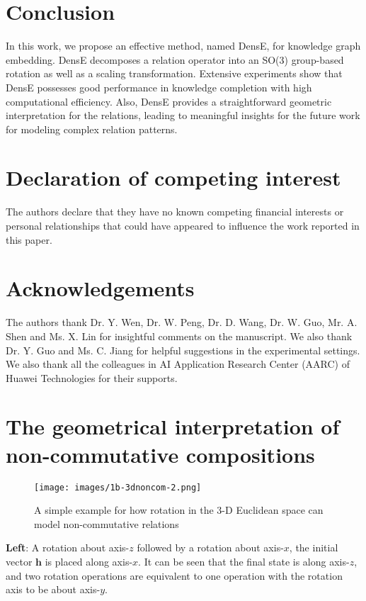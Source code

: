 \documentclass[11pt]{article}
\begin{document}
\section{Conclusion}
In this work, we propose an effective method, named DensE, for knowledge graph embedding. DensE decomposes a relation operator into an SO(3) group-based rotation as well as a scaling transformation. Extensive experiments show that DensE possesses good performance in knowledge completion with high computational efficiency. Also, DensE provides a straightforward geometric interpretation for the relations, leading to meaningful insights for the future work for modeling complex relation patterns.

\section*{Declaration of competing interest}
The authors declare that they have no known competing financial interests or personal relationships that could have appeared to influence the work reported in this paper.

\section*{Acknowledgements}
The authors thank Dr. Y. Wen, Dr. W. Peng, Dr. D. Wang, Dr. W. Guo, Mr. A. Shen and Ms. X. Lin for insightful comments on the manuscript. We also thank Dr. Y. Guo and Ms. C. Jiang for helpful suggestions in the experimental settings. We also thank all the colleagues in AI Application Research Center (AARC) of Huawei Technologies for their supports.




\appendix

\section{The geometrical interpretation of non-commutative compositions}

\begin{figure}[!ht]
\centering     \texttt{[image: images/1b-3dnoncom-2.png]}
\caption{A simple example for how rotation in the 3-D Euclidean space can model non-commutative relations}
\label{simple example for how rotation in 3D-Euclidean space can model non-commutative relations}
\end{figure}

\textbf{Left}: A rotation about axis-\(z\) followed by a rotation about axis-\(x\), the initial vector \(\textbf{h}\) is placed along axis-\(x\). It can be seen that the final state is along axis-\(z\), and two rotation operations are equivalent to one operation with the rotation axis to be about axis-\(y\).
\end{document}
